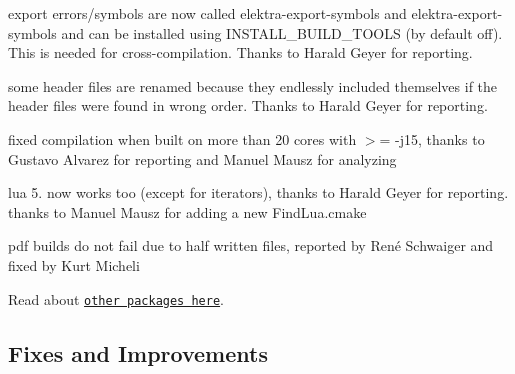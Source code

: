 \begin{DoxyItemize}
\item export errors/symbols are now called {\ttfamily elektra-\/export-\/symbols} and {\ttfamily elektra-\/export-\/symbols} and can be installed using {\ttfamily I\+N\+S\+T\+A\+L\+L\+\_\+\+B\+U\+I\+L\+D\+\_\+\+T\+O\+O\+L\+S} (by default off). This is needed for cross-\/compilation. Thanks to Harald Geyer for reporting.
\item some header files are renamed because they endlessly included themselves if the header files were found in wrong order. Thanks to Harald Geyer for reporting.
\item fixed compilation when built on more than 20 cores with $>$= -\/j15, thanks to Gustavo Alvarez for reporting and Manuel Mausz for analyzing
\item lua 5. now works too (except for iterators), thanks to Harald Geyer for reporting. thanks to Manuel Mausz for adding a new Find\+Lua.\+cmake
\item pdf builds do not fail due to half written files, reported by René Schwaiger and fixed by Kurt Micheli
\end{DoxyItemize}

Read about \href{https://github.com/ElektraInitiative/libelektra#packages}{\tt other packages here}.

\subsection*{Fixes and Improvements}


